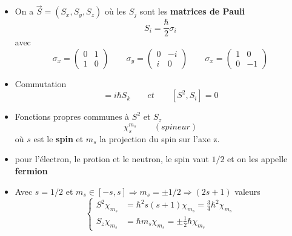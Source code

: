 \begin{itemize}
	\item On a $\vec{S} = (S_x,S_y,S_z)$ où les $S_j$ sont les \textbf{matrices de Pauli} 
	      \begin{equation}
	      	S_i = \frac{\hbar}{2}\sigma _i
	      \end{equation}
	      avec
	      \begin{equation}
	      	\sigma _x = 
	      	\left(
	      	\begin{array}{cc}
	      		0 & 1 \\ 
	      		1 & 0 
	      	\end{array}
	      	\right)
	      	\qquad
	      	\sigma _y = 
	      	\left(
	      	\begin{array}{cc}
	      		0 & -i \\ 
	      		i & 0  
	      	\end{array}
	      	\right)
	      	\qquad
	      	\sigma _x = 
	      	\left(
	      	\begin{array}{cc}
	      		1 & 0  \\ 
	      		0 & -1 
	      	\end{array}
	      	\right) 
	      \end{equation}
	      	
	\item Commutation
	      \begin{equation}
	      	[S_i,S_j] = i\hbar S_k \qquad et \qquad[S^2,S_i] = 0
	      \end{equation}
	      		
	\item Fonctions propres communes à $S^2$ et $S_z$
	      \begin{equation}
	      	\chi ^{m_s}_s \qquad (spineur)
	      \end{equation}
	      où $s$ est le \textbf{spin} et $m_s$ la projection du spin sur l'axe z. 
	      	
	\item pour l'électron, le protion et le neutron, le spin vaut $1/2$ et on les appelle \textbf{fermion}
	      	
	\item Avec $s = 1/2$ et $m_s \in [-s,s] \Rightarrow m_s = \pm 1/2 \Rightarrow(2s + 1)$ valeurs
	      \begin{equation}
	      	\left\{
	      	\begin{aligned}
	      		S^2 \chi _{m_s} & = \hbar ^2 s(s+1) \chi _{m_s} = \frac{3}{4}\hbar ^2 \chi _{m_s} \\
	      		S_z \chi _{m_s} & = \hbar m_s \chi _{m_s} = \pm \frac{1}{2}\hbar \chi _{m_s}      
	      	\end{aligned}
	      	\right.
	      \end{equation}
	      		

\end{itemize}
